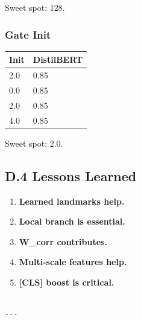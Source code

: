 Sweet spot: 128.

\subsubsection{Gate Init}

\begin{table}[H]
\centering
\small
\begin{tabular}{ll}
\toprule
\textbf{Init} & \textbf{DistilBERT} \\
\midrule
2.0 & 0.85 \\
0.0 & 0.85 \\
2.0 & 0.85 \\
4.0 & 0.85 \\
\bottomrule
\end{tabular}
\end{table}

Sweet spot: 2.0.

\subsection{D.4 Lessons Learned}

\begin{enumerate}
\item \textbf{Learned landmarks help.}
\item \textbf{Local branch is essential.}
\item \textbf{W\_corr contributes.}
\item \textbf{Multi-scale features help.}
\item \textbf{[CLS] boost is critical.}
\end{enumerate}
\begin{lstlisting}

---
\end{lstlisting}
